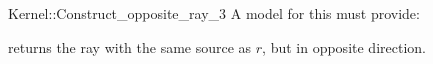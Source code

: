 \begin{ccRefFunctionObjectConcept}{Kernel::Construct_opposite_ray_3}
A model for this must provide:


{returns the ray with the same source as $r$, but in opposite direction.}

\end{ccRefFunctionObjectConcept}
